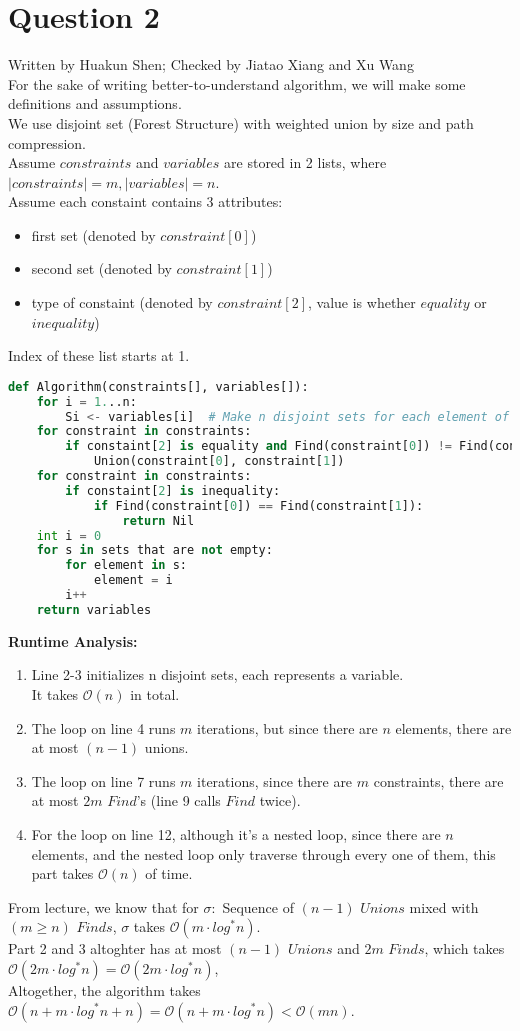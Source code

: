 \documentclass[10pt]{article}
\begin{document}
\newpage
\section*{Question 2} Written by Huakun Shen; Checked by Jiatao Xiang and Xu Wang\\
For the sake of writing better-to-understand algorithm, we will make some definitions and assumptions.\\
We use disjoint set (Forest Structure) with weighted union by size and path compression.\\
Assume $constraints$ and $variables$ are stored in 2 lists, where $|constraints|=m, |variables|=n$.\\
Assume each constaint contains 3 attributes: 
\begin{itemize}
\item first set (denoted by $constraint[0]$)
\item second set (denoted by $constraint[1]$)
\item type of constaint (denoted by $constraint[2]$, value is whether $equality$ or $inequality$)
\end{itemize}
Index of these list starts at 1.
\begin{lstlisting}[language=Python]
def Algorithm(constraints[], variables[]):
	for i = 1...n:
		Si <- variables[i]	# Make n disjoint sets for each element of variables named S1...Sn
	for constraint in constraints:
		if constaint[2] is equality and Find(constraint[0]) != Find(constraint[1]):
			Union(constraint[0], constraint[1])
	for constraint in constraints:
		if constaint[2] is inequality:
			if Find(constraint[0]) == Find(constraint[1]):
				return Nil
	int i = 0
	for s in sets that are not empty:
		for element in s:
			element = i		
		i++
	return variables
\end{lstlisting}
\textbf{Runtime Analysis:}
\begin{enumerate}
\item Line 2-3 initializes n disjoint sets, each represents a variable.\\
It takes $\mathcal{O}(n)$ in total.
\item The loop on line 4 runs $m$ iterations, but since there are $n$ elements, there are at most $(n-1)$ unions.
\item The loop on line 7 runs $m$ iterations, since there are $m$ constraints, there are at most $2m$ $Find$'s (line 9 calls $Find$ twice).
\item For the loop on line 12, although it's a nested loop, since there are $n$ elements, and the nested loop only traverse through every one of them, this part takes $\mathcal{O}(n)$ of time.
\end{enumerate}
From lecture, we know that for $\sigma:$ Sequence of $(n-1)$ $Unions$ mixed with $(m\geq n)$ $Finds$, $\sigma$ takes $\mathcal{O}(m\cdot log^*n)$.\\
Part 2 and 3 altoghter has at most $(n-1)$ $Unions$ and $2m$ $Finds$, which takes $\mathcal{O}(2m\cdot log^*n)=\mathcal{O}(2m\cdot log^*n)$,\\
Altogether, the algorithm takes $\mathcal{O}(n+m\cdot log^*n + n)=\mathcal{O}(n+m\cdot log^*n)<\mathcal{O}(mn)$.
\end{document}
